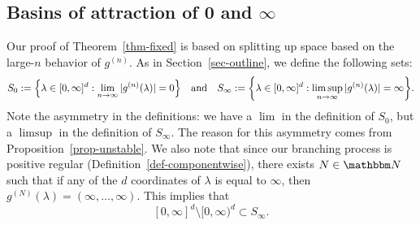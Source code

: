 \documentclass[11pt]{article}
\theoremstyle{plain}
\theoremstyle{definition}
\numberwithin{equation}{section}
\newcommand{\eqb}{\begin{equation}}
\newcommand{\eqe}{\end{equation}}
\newcommand{\eqbn}{\begin{equation*}}
\newcommand{\eqen}{\end{equation*}}
\newcommand{\BB}{\mathbbm}
\newcommand{\ol}{\overline}
\let\originalleft\left
\let\originalright\right
\renewcommand{\left}{\mathopen{}\mathclose\bgroup\originalleft}
\renewcommand{\right}{\aftergroup\egroup\originalright}
\begin{document}

\subsection{Basins of attraction of 0 and $\infty$}
\label{sec-basins}

Our proof of Theorem~\ref{thm-fixed} is based on splitting up space based on the large-$n$ behavior of $g^{(n)}$. 
As in Section~\ref{sec-outline}, we define the following sets: 
\eqb \label{eqn-basin-def}
S_0 := \left\{\lambda \in [0,\infty]^d : \lim_{n\to\infty} |g^{(n)}(\lambda)| = 0\right\} \quad \text{and} \quad 
S_\infty := \left\{ \lambda \in [0,\infty]^d : \limsup_{n\to\infty} |g^{(n)}(\lambda)| = \infty \right\} .
\eqe 
Note the asymmetry in the definitions: we have a $\lim$ in the definition of $S_0$, but a $\limsup$ in the definition of $S_\infty$. The reason for this asymmetry comes from Proposition~\ref{prop-unstable}. 
We also note that since our branching process is positive regular (Definition~\ref{def-componentwise}), there exists $N\in\BB N$ such that if any of the $d$ coordinates of $\lambda$ is equal to $\infty$, then $g^{(N)}(\lambda) = (\infty,\dots,\infty)$. This implies that
\eqb \label{eqn-infty-subset}
[0,\infty]^d\setminus [0,\infty)^d \subset S_\infty.
\eqe 
    
\end{document}
